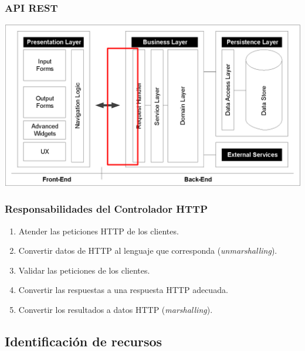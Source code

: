 \documentclass[handout,a4paper,slidestop,xcolor=pst,blue]{beamer}
\begin{document}
\begin{frame}[c]
    \frametitle{API REST}
    \begin{center}
        \includegraphics[width=\linewidth]{images/apiRest/enterpriseArchitectures(api).eps}
    \end{center}
\end{frame}

\begin{frame}[c]
	\frametitle{Responsabilidades del Controlador HTTP}
	\begin{enumerate}[<+->]
        \item Atender las peticiones HTTP de los clientes.
        \item Convertir datos de HTTP al lenguaje que corresponda (\emph{unmarshalling}).
        \item Validar las peticiones de los clientes.
        \item Convertir las respuestas a una respuesta HTTP adecuada.
        \item Convertir los resultados a datos HTTP (\emph{marshalling}).
	\end{enumerate}
\end{frame}

\subsection{Identificación de recursos}
\end{document}
